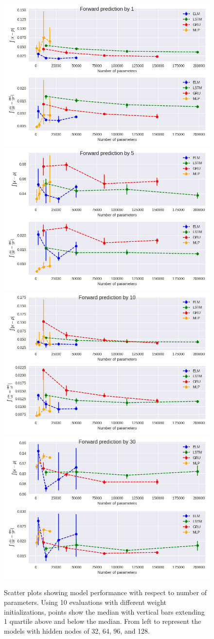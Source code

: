 \documentclass[11pt]{article}
\begin{document}
  \begin{figure}
    \begin{center}
  \includegraphics[width=.48\textwidth]{figures/mg1_scatter_1.png}
  \includegraphics[width=.48\textwidth]{figures/mg1_scatter_5.png}
  \includegraphics[width=.48\textwidth]{figures/mg1_scatter_10.png}
  \includegraphics[width=.48\textwidth]{figures/mg1_scatter_30.png}
       
    \caption{Scatter plots showing model performance with respect to
      number of parameters. Using 10 evaluations with different weight
    initializations, points show the median with vertical bars
    extending 1 quartile above and below the median. From left to
    represent the models with hidden nodes of 32, 64, 96, and 128.}
    \label{fig:mg1_scatter}
    \end{center}
  \end{figure}
\end{document}
